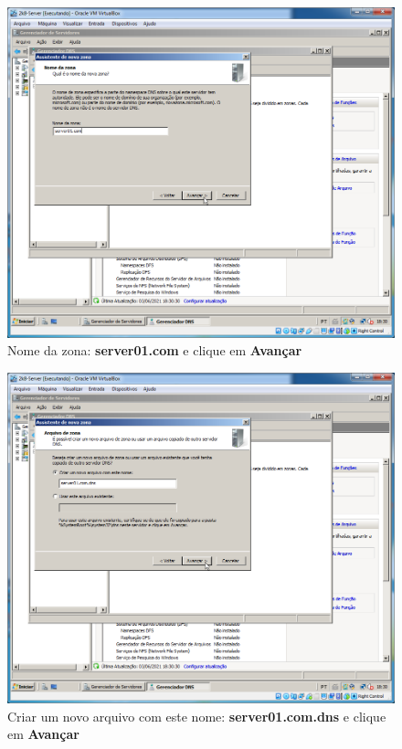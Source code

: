\documentclass[10pt]{article}
\begin{document}
\begin{figure}[H]
    \centering
    \caption{Nome da zona: \textbf{server01.com} e clique em \textbf{Avançar}}
    \label{fig:DNS016}
    \includegraphics[width=\linewidth]{images/windows_server/dns/016.png}
\end{figure}
\begin{figure}[H]
    \centering
    \caption{Criar um novo arquivo com este nome: \textbf{server01.com.dns} e clique em \textbf{Avançar}}
    \label{fig:DNS017}
    \includegraphics[width=\linewidth]{images/windows_server/dns/017.png}
\end{figure}
\end{document}
